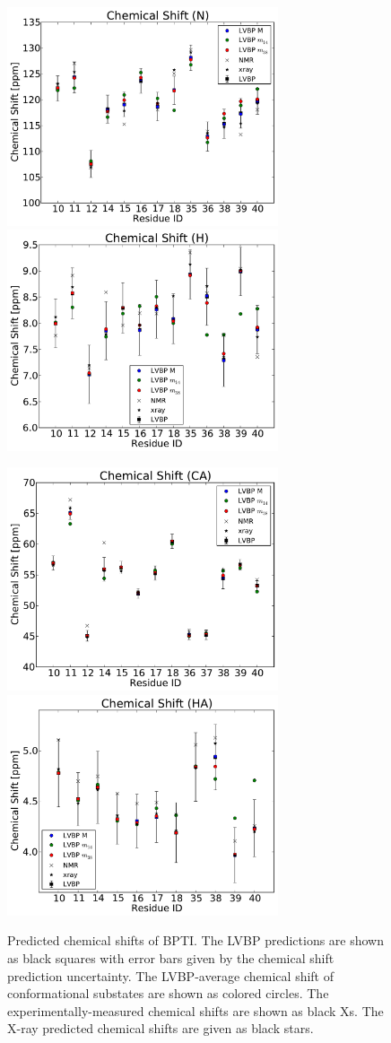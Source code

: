 \documentclass[journal=jacsat,manuscript=article]{achemso}
\begin{document}
\begin{figure}
\includegraphics[width=8cm]{figures/BPTI_shifts_N.pdf}
\includegraphics[width=8cm]{figures/BPTI_shifts_H.pdf}

\includegraphics[width=8cm]{figures/BPTI_shifts_CA.pdf}
\includegraphics[width=8cm]{figures/BPTI_shifts_HA.pdf}
\caption{
Predicted chemical shifts of BPTI.  The LVBP predictions are shown as black squares with error bars given by the chemical shift prediction uncertainty.  The LVBP-average chemical shift of conformational substates are shown as colored circles.  The experimentally-measured chemical shifts are shown as black Xs.  The X-ray predicted chemical shifts are given as black stars.  
}
\label{figure:BPTI_Shifts}
\end{figure}
\end{document}
